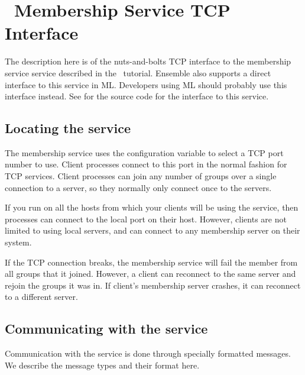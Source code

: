 %
%
%
\section{\ensemble\ Membership Service TCP Interface}
\label{section:memership}


The description here is of the nuts-and-bolts TCP interface to the
 membership service service described in the
\ensemble\ tutorial.  Ensemble also supports a direct interface to
this service in ML.  Developers using ML should probably use this
interface instead.  See  for the source
code for the interface to this service.

\subsection{Locating the service}
The membership service uses the configuration variable
 to select a TCP port number to use.  Client
processes connect to this port in the normal fashion for TCP
services.  Client processes can join any number of groups over a
single connection to a server, so they normally only connect once to
the servers.

If you run  on all the hosts from which your clients
will be using the service, then processes can connect to the local
port on their host.  However, clients are not limited to using local
servers, and can connect to any membership server on their system.

If the TCP connection breaks, the membership service will fail the
member from all groups that it joined.  However, a client can
reconnect to the same server and rejoin the groups it was in.  If
client's membership server crashes, it can reconnect to a different
server.

\subsection{Communicating with the service}
Communication with the service is done through specially formatted
messages.  We describe the message types and their format here.

